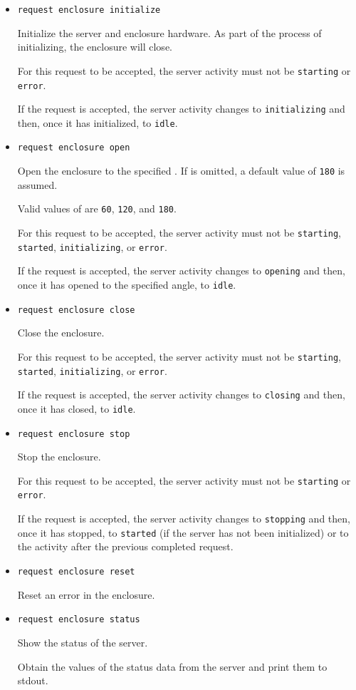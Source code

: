 \begin{itemize}
\item
\verb|request enclosure initialize|

Initialize the server and enclosure hardware. As part of the process of initializing, the enclosure will close.

For this request to be accepted, the server activity must not be \verb|starting| or \verb|error|.

If the request is accepted, the server activity changes to \verb|initializing| and then, once it has initialized, to \verb|idle|.

\item
\verb|request enclosure open| 

Open the enclosure to the specified . If  is omitted, a default value of \verb|180| is assumed.

Valid values of  are \verb|60|, \verb|120|, and \verb|180|.

For this request to be accepted, the server activity must not be \verb|starting|, \verb|started|, \verb|initializing|, or \verb|error|.

If the request is accepted, the server activity changes to \verb|opening| and then, once it has opened to the specified angle, to \verb|idle|.

\item
\verb|request enclosure close|

Close the enclosure.

For this request to be accepted, the server activity must not be \verb|starting|, \verb|started|, \verb|initializing|, or \verb|error|.

If the request is accepted, the server activity changes to \verb|closing| and then, once it has closed, to \verb|idle|.

\item
\verb|request enclosure stop|

Stop the enclosure.

For this request to be accepted, the server activity must not be \verb|starting| or \verb|error|.

If the request is accepted, the server activity changes to \verb|stopping| and then, once it has stopped, to \verb|started| (if the server has not been initialized) or to the activity after the previous completed request.

\item
\verb|request enclosure reset|

Reset an error in the enclosure.


\item
\verb|request enclosure status|

Show the status of the server.

Obtain the values of the status data from the server and print them to stdout.
\end{itemize}

